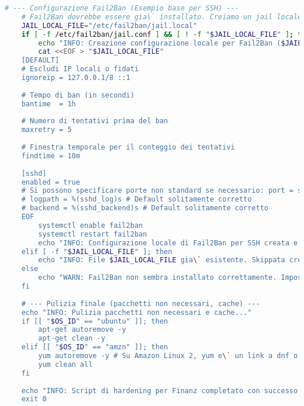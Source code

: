 \begin{lstlisting}[language=Bash, style=bash, caption={Script di Hardening del Sistema Operativo (hardening\_script.sh)}, label={lst:hardening_script_cap2}]
    # --- Configurazione Fail2Ban (Esempio base per SSH) ---
    # Fail2Ban dovrebbe essere gia\` installato. Creiamo un jail locale per SSH.
    JAIL_LOCAL_FILE="/etc/fail2ban/jail.local"
    if [ -f /etc/fail2ban/jail.conf ] && [ ! -f "$JAIL_LOCAL_FILE" ]; then
        echo "INFO: Creazione configurazione locale per Fail2Ban ($JAIL_LOCAL_FILE)..."
        cat <<EOF > "$JAIL_LOCAL_FILE"
    [DEFAULT]
    # Escludi IP locali o fidati
    ignoreip = 127.0.0.1/8 ::1
    
    # Tempo di ban (in secondi)
    bantime  = 1h
    
    # Numero di tentativi prima del ban
    maxretry = 5
    
    # Finestra temporale per il conteggio dei tentativi
    findtime = 10m
    
    [sshd]
    enabled = true
    # Si possono specificare porte non standard se necessario: port = ssh,tuaporta
    # logpath = %(sshd_log)s # Default solitamente corretto
    # backend = %(sshd_backend)s # Default solitamente corretto
    EOF
        systemctl enable fail2ban
        systemctl restart fail2ban
        echo "INFO: Configurazione locale di Fail2Ban per SSH creata e servizio riavviato."
    elif [ -f "$JAIL_LOCAL_FILE" ]; then
        echo "INFO: File $JAIL_LOCAL_FILE gia\` esistente. Skippata creazione jail.local per Fail2Ban."
    else
        echo "WARN: Fail2Ban non sembra installato correttamente. Impossibile configurare jail.local."
    fi
    
    # --- Pulizia finale (pacchetti non necessari, cache) ---
    echo "INFO: Pulizia pacchetti non necessari e cache..."
    if [[ "$OS_ID" == "ubuntu" ]]; then
        apt-get autoremove -y
        apt-get clean -y
    elif [[ "$OS_ID" == "amzn" ]]; then
        yum autoremove -y # Su Amazon Linux 2, yum e\` un link a dnf o yum stesso
        yum clean all
    fi
    
    echo "INFO: Script di hardening per Finanz completato con successo - $(date)"
    exit 0
        \end{lstlisting}
